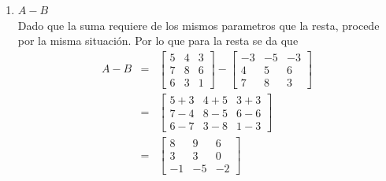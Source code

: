 \documentclass[12pt]{article}
\begin{document}
\begin{enumerate}
\begin{enumerate}
\begin{enumerate}
			\item $A-B$ \\ Dado que la suma requiere de los mismos parametros que la resta, procede por la misma situaci\'on. Por lo que para la resta se da que
				\begin{eqnarray*}
					A - B &=& 	\begin{bmatrix}
									5 & 4 & 3 \\
									7 & 8 & 6 \\
									6 & 3 & 1
								\end{bmatrix} - \begin{bmatrix}
									-3&-5 &-3 \\
									4 & 5 & 6 \\
									7 & 8 & 3
								\end{bmatrix} \\
					&=& \begin{bmatrix}
					 		5+3 & 4+5 & 3+3 \\
							7-4 & 8-5 & 6-6 \\
							6-7 & 3-8 & 1-3
						\end{bmatrix} \\
					&=& \begin{bmatrix}
							8 & 9 & 6 \\
							3 & 3 & 0 \\
							-1&-5 &-2
						\end{bmatrix}
				\end{eqnarray*}
			

\end{enumerate}
\end{enumerate}
\end{enumerate}
\end{document}
